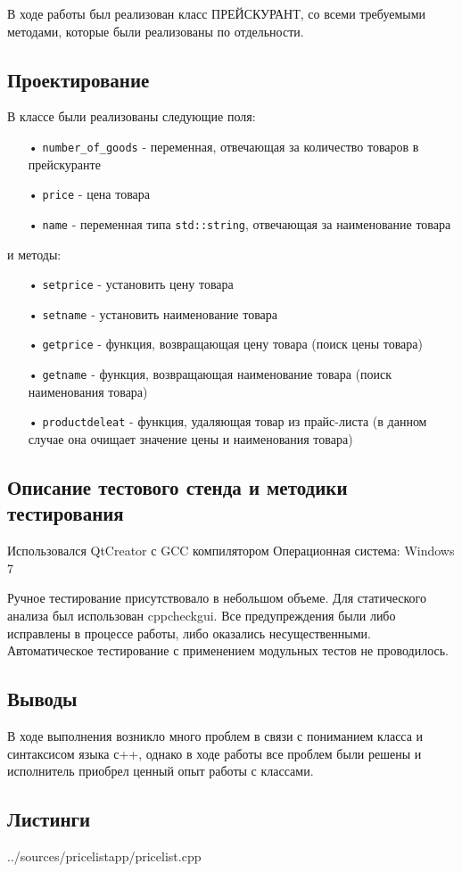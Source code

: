 \documentclass[12pt,a4paper]{report}
\begin{document}

В ходе работы был реализован класс ПРЕЙСКУРАНТ, со всеми требуемыми методами, которые были реализованы по отдельности.

\subsection{Проектирование}

В классе были реализованы следующие поля:
\begin{enumerate}
\item[•]  \verb-number_of_goods- - переменная, отвечающая за количество товаров в прейскуранте
\item[•]  \verb-price- - цена товара
\item[•]  \verb-name- - переменная типа \verb-std::string-, отвечающая за наименование товара
\end{enumerate}

и методы:
\begin{enumerate}
\item[•]  \verb-setprice- - установить цену товара
\item[•]  \verb-setname- - установить наименование товара
\item[•]  \verb-getprice- - функция, возвращающая цену товара (поиск цены товара)
\item[•]  \verb-getname- - функция, возвращающая наименование товара (поиск наименования товара)
\item[•]  \verb-productdeleat- - функция, удаляющая товар из прайс-листа (в данном случае она очищает значение цены и наименования товара)
\end{enumerate}


\subsection{Описание тестового стенда и методики тестирования}
Использовался QtCreator с GCC компилятором
Операционная система: Windows 7


Ручное тестирование присутствовало в небольшом объеме.
Для статического анализа был использован cppcheckgui. Все предупреждения были либо исправлены в процессе работы, либо оказались несущественными.
Автоматическое тестирование с применением модульных тестов не проводилось.

\subsection{Выводы}

В ходе выполнения возникло много проблем в связи с пониманием класса и синтаксисом языка с++, однако в ходе работы все проблем были решены и исполнитель приобрел ценный опыт работы с классами.
\subsection{Листинги}

{../sources/pricelistapp/pricelist.cpp}
\end{document}
